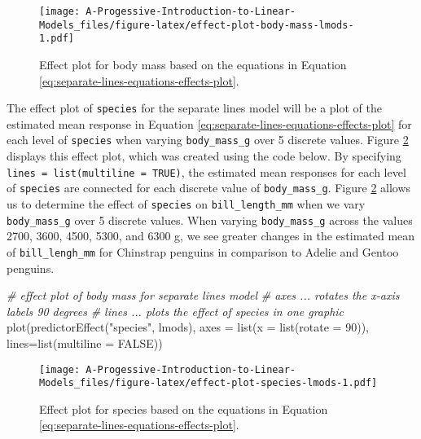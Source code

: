 \documentclass[
]{book}
\newenvironment{Shaded}{\begin{snugshade}}{\end{snugshade}}
\newcommand{\AttributeTok}[1]{\textcolor[rgb]{0.77,0.63,0.00}{#1}}
\newcommand{\CommentTok}[1]{\textcolor[rgb]{0.56,0.35,0.01}{\textit{#1}}}
\newcommand{\ConstantTok}[1]{\textcolor[rgb]{0.00,0.00,0.00}{#1}}
\newcommand{\DecValTok}[1]{\textcolor[rgb]{0.00,0.00,0.81}{#1}}
\newcommand{\FunctionTok}[1]{\textcolor[rgb]{0.00,0.00,0.00}{#1}}
\newcommand{\NormalTok}[1]{#1}
\newcommand{\StringTok}[1]{\textcolor[rgb]{0.31,0.60,0.02}{#1}}
\theoremstyle{definition}
\theoremstyle{definition}
\theoremstyle{definition}
\theoremstyle{definition}
\theoremstyle{remark}
\begin{document}
\begin{figure}
\centering
\texttt{[image: A-Progessive-Introduction-to-Linear-Models\_files/figure-latex/effect-plot-body-mass-lmods-1.pdf]}
\caption{\label{fig:effect-plot-body-mass-lmods}Effect plot for body mass based on the equations in Equation \eqref{eq:separate-lines-equations-effects-plot}.}
\end{figure}

The effect plot of \texttt{species} for the separate lines model will be a plot
of the estimated mean response in Equation
\eqref{eq:separate-lines-equations-effects-plot} for each level of
\texttt{species} when varying \texttt{body\_mass\_g} over 5 discrete values. Figure
\ref{fig:effect-plot-species-lmods} displays this effect plot, which
was created using the code below. By specifying
\texttt{lines\ =\ list(multiline\ =\ TRUE)}, the estimated mean responses for each
level of \texttt{species} are connected for each discrete value of
\texttt{body\_mass\_g}. Figure \ref{fig:effect-plot-species-lmods} allows us to
determine the effect of \texttt{species} on \texttt{bill\_length\_mm} when we vary
\texttt{body\_mass\_g} over 5 discrete values. When varying \texttt{body\_mass\_g} across
the values 2700, 3600, 4500, 5300, and 6300 g, we see greater changes in
the estimated mean of \texttt{bill\_lengh\_mm} for Chinstrap penguins in
comparison to Adelie and Gentoo penguins.

\begin{Shaded}
\begin{Highlighting}[]
\CommentTok{\# effect plot of body mass for separate lines model}
\CommentTok{\# axes ... rotates the x{-}axis labels 90 degrees}
\CommentTok{\# lines ... plots the effect of species in one graphic}
\FunctionTok{plot}\NormalTok{(}\FunctionTok{predictorEffect}\NormalTok{(}\StringTok{"species"}\NormalTok{, lmods),}
     \AttributeTok{axes =} \FunctionTok{list}\NormalTok{(}\AttributeTok{x =} \FunctionTok{list}\NormalTok{(}\AttributeTok{rotate =} \DecValTok{90}\NormalTok{)),}
     \AttributeTok{lines=}\FunctionTok{list}\NormalTok{(}\AttributeTok{multiline =} \ConstantTok{FALSE}\NormalTok{))}
\end{Highlighting}
\end{Shaded}

\begin{figure}
\centering
\texttt{[image: A-Progessive-Introduction-to-Linear-Models\_files/figure-latex/effect-plot-species-lmods-1.pdf]}
\caption{\label{fig:effect-plot-species-lmods}Effect plot for species based on the equations in Equation \eqref{eq:separate-lines-equations-effects-plot}.}
\end{figure}
\end{document}
